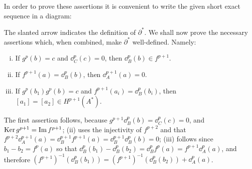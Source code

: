 In order to prove these assertions it is convenient to write the given short exact
sequence in a diagram:


\begin{center}
\end{center}

The slanted arrow indicates the definition of $\partial^*$. We shall now prove the necessary
assertions which, when combined, make $\partial^*$ well-defined. Namely:
\begin{enumerate}[(i)]
  \item If $g^p(b) = c$  and $\dd^p_C(c) = 0$, then $\dd^p_B(b) \in f^{p+1}$.
  \item If $f^{p+1}(a) = \dd^p_B(b)$, then $\dd^{p+1}_A(a) = 0$.
  \item If $g^p(b_1)  g^p(b) = c$ and $f^{p+1}(a_i) = \dd^p_B(b_i)$, then $[a_1]=[a_2] \in H^{p+1}(A^*)$.
\end{enumerate}



The first assertion follows, because $g^{p+1}\dd^p_B(b) = \dd^p_C(c) = 0$, and $\operatorname{Ker} g^{p+1} = \operatorname{Im} f^{p+1}$;
(ii) uses the injectivity of $f^{p+2}$ and that $f^{p+2}\dd^{p+1}_A(a) = \dd^{p+1}_Bf^{p+1}(a) = \dd^{p+1}_B\dd^p_B(b) = 0$;
(iii) follows since $b_1-b_2 = f^p(a)$ so that $\dd^p_B(b_1) - \dd^p_B(b_2) = \dd^p_Bf^p(a) = f^{p+1}\dd^p_A(a)$, 
and therefore $(f^{p+1})^{-1}(\dd^p_B(b_1)) = (f^{p+1})^{-1} (\dd^p_B(b_2)) + \dd^p_A(a)$.

